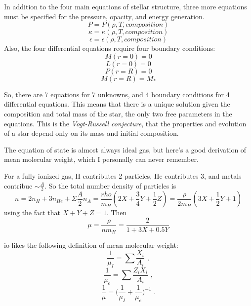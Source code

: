 In addition to the four main equations of stellar structure, three more equations must be 
specified for the pressure, opacity, and energy generation.  
\begin{equation}
P=P(\rho,T,composition)
\end{equation}
\begin{equation}
\kappa=\kappa(\rho,T,composition)
\end{equation}
\begin{equation}
\epsilon=\epsilon(\rho,T,composition)
\end{equation}
Also, the four differential equations require four boundary conditions:
\begin{equation}
M(r=0)=0
\end{equation}
\begin{equation}
L(r=0)=0
\end{equation}
\begin{equation}
P(r=R)=0
\end{equation}
\begin{equation}
M(r=R)=M_*
\end{equation}

So, there are 7 equations for 7 unknowns, and 4 boundary conditions for 4 differential equations.  
This means that there is a unique solution given the composition and total mass of the star, the 
only two free parameters in the equations.  This is the \emph{Vogt-Russell conjecture}, that the 
properties and evolution of a star depend only on its mass and initial composition.

The equation of state is almost always ideal gas, but here's a good derivation of mean molecular 
weight, which I personally can never remember.

For a fully ionized gas, H contributes 2 particles, He contributes 3, and metals contribue 
$\sim\frac{A}{2}$.  So the total number density of particles is
\begin{equation}
n=2n_H+3n_{He}+\Sigma \frac{A}{2}n_A=\frac{rho}{m_H}\left(2X+\frac{3}{4}Y+\frac{1}{2}Z\right)=\frac{\rho}{2m_H}\left(3X+\frac{1}{2}Y+1\right)
\end{equation}
using the fact that $X+Y+Z=1$.  Then
\begin{equation}
\mu=\frac{\rho}{nm_H}=\frac{2}{1+3X+0.5Y}
\end{equation}

io likes the following definition of mean molecular weight:
\begin{equation}
\frac{1}{\mu_I} = \sum \frac{X_i}{A_i}\,\, ,
\end{equation}
\begin{equation}
\frac{1}{\mu_e} = \sum \frac{Z_iX_i}{A_i} \,\, ,
\end{equation}
\begin{equation}
\frac{1}{\mu} = \biggl(\frac{1}{\mu_I} + \frac{1}{\mu_e} \biggr)^{-1}\,\,.
\end{equation}

